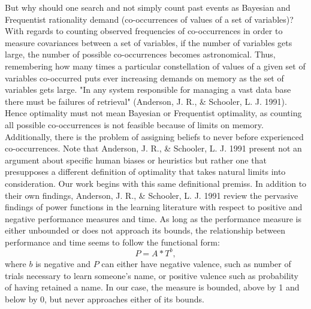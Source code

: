 But why should one search and not simply count past events as Bayesian and Frequentist rationality demand (co-occurrences of values of a set of variables)?  With regards to counting observed frequencies of co-occurrences in order to measure covariances between a set of variables, if the number of variables gets large, the number of possible co-occurrences becomes astronomical.  Thus, remembering how many times a particular constellation of values of a given set of variables co-occurred puts ever increasing demands on memory as the set of variables gets large.  "In any system responsible for managing a vast data base there must be failures of retrieval" (Anderson, J. R., \& Schooler, L. J. 1991).  Hence optimality must not mean Bayesian or Frequentist optimality, as counting all possible co-occurrences is not feasible because of limits on memory.  Additionally, there is the problem of assigning beliefs to never before experienced co-occurrences.  Note that Anderson, J. R., \& Schooler, L. J. 1991 present not an argument about specific human biases or heuristics but rather one that presupposes a different definition of optimality that takes natural limits into consideration.  Our work begins with this same definitional premiss.  In addition to their own findings, Anderson, J. R., \& Schooler, L. J. 1991 review the pervasive findings of power functions in the learning literature with respect to positive and negative performance measures and time.  As long as the performance measure is either unbounded or does not approach its bounds, the relationship between performance and time seems to follow the functional form:
$$P = A*T^{b},$$
where $b$ is negative and $P$ can either have negative valence, such as number of trials necessary to learn someone's name, or positive valence such as probability of having retained a name. In our case, the measure is bounded, above by 1 and below by 0, but never approaches either of its bounds. 




